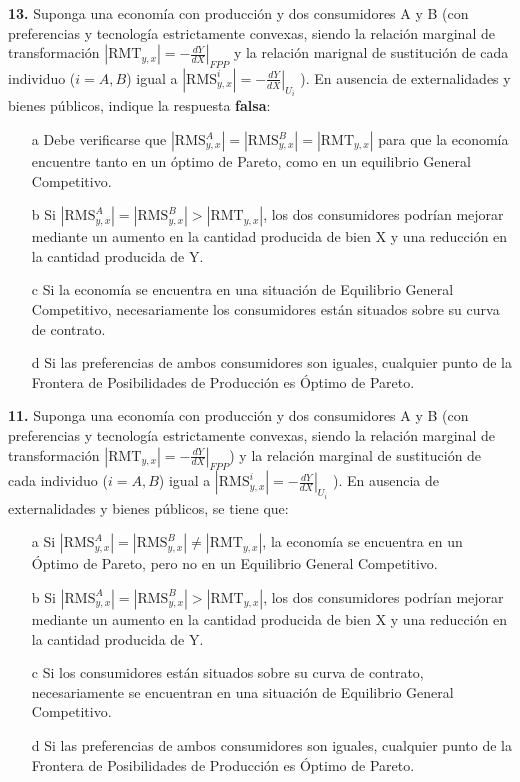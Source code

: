 \documentclass{nuevotema}
\begin{document}
\textbf{13.} Suponga una economía con producción y dos consumidores A y B (con preferencias y tecnología estrictamente convexas, siendo la relación marginal de transformación $\left| \text{RMT}_{y,x} \right| = \left. - \frac{d Y}{d X}\right|_{FPP}$ y la relación marignal de sustitución de cada individuo ($i=A,B$) igual a $\left| \text{RMS}^i_{y,x} \right| = \left. -\frac{d Y}{d X} \right|_{U_i} $ ). En ausencia de externalidades y bienes públicos, indique la respuesta \textbf{falsa}:
\begin{itemize}
	\item[a] Debe verificarse que $\left| \text{RMS}_{y,x}^A \right| = \left| \text{RMS}_{y,x}^B \right| = \left| \text{RMT}_{y,x} \right|$ para que la economía encuentre tanto en un óptimo de Pareto, como en un equilibrio General Competitivo. 
	\item[b] Si $\left| \text{RMS}_{y,x}^A \right| = \left| \text{RMS}_{y,x}^B \right| > \left| \text{RMT}_{y,x} \right|$, los dos consumidores podrían mejorar mediante un aumento en la cantidad producida de bien X y una reducción en la cantidad producida de Y.
	\item[c] Si la economía se encuentra en una situación de Equilibrio General Competitivo, necesariamente los consumidores están situados sobre su curva de contrato.
	\item[d] Si las preferencias de ambos consumidores son iguales, cualquier punto de la Frontera de Posibilidades de Producción es Óptimo de Pareto.
\end{itemize}

\textbf{11.} Suponga una economía con producción y dos consumidores A y B (con preferencias y tecnología estrictamente convexas, siendo la relación marginal de transformación $\left| \text{RMT}_{y,x} \right| = - \left. \frac{d Y}{d X} \right|_{FPP}$) y la relación marginal de sustitución de cada individuo ($i=A,B$) igual a $\left| \text{RMS}_{y,x}^i \right| = - \left. \frac{d Y}{d X} \right|_{U_i}$ ). En ausencia de externalidades y bienes públicos, se tiene que:

\begin{itemize}
	\item[a] Si $\left| \text{RMS}_{y,x}^A \right| = \left| \text{RMS}^B_{y,x} \right| \neq \left| \text{RMT}_{y,x} \right|$, la economía se encuentra en un Óptimo de Pareto, pero no en un Equilibrio General Competitivo.
	\item[b] Si $\left| \text{RMS}_{y,x}^A \right| = \left| \text{RMS}_{y,x}^B \right| > \left| \text{RMT}_{y,x} \right|$, los dos consumidores podrían mejorar mediante un aumento en la cantidad producida de bien X y una reducción en la cantidad producida de Y.
	\item[c] Si los consumidores están situados sobre su curva de contrato, necesariamente se encuentran en una situación de Equilibrio General Competitivo.
	\item[d] Si las preferencias de ambos consumidores son iguales, cualquier punto de la Frontera de Posibilidades de Producción es Óptimo de Pareto.
\end{itemize}
\end{document}

